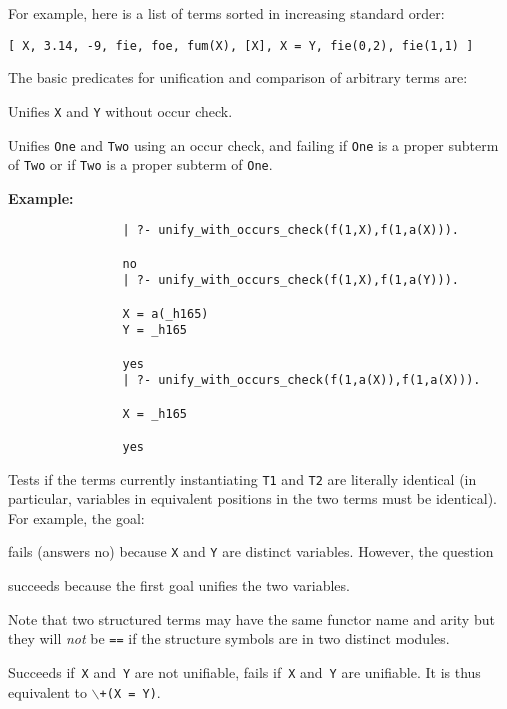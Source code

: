 For example, here is a list of terms sorted in increasing standard order:
\begin{center}
	{\tt [ X, 3.14, -9, fie, foe, fum(X), [X], X = Y, fie(0,2), fie(1,1) ]}
\end{center}
The basic predicates for unification and comparison of arbitrary terms are:
\begin{description}

    Unifies {\tt X} and {\tt Y} without occur check.

%
Unifies {\tt One} and {\tt Two} using an occur check, and failing if
{\tt One} is a proper subterm of {\tt Two} or if {\tt Two} is a proper
subterm of {\tt One}.  

{\bf Example:}
    {\footnotesize
     \begin{verbatim}
                | ?- unify_with_occurs_check(f(1,X),f(1,a(X))).

                no
                | ?- unify_with_occurs_check(f(1,X),f(1,a(Y))).

                X = a(_h165)
                Y = _h165

                yes
                | ?- unify_with_occurs_check(f(1,a(X)),f(1,a(X))).

                X = _h165

                yes
  \end{verbatim}}

%
    Tests if the terms currently instantiating {\tt T1} and {\tt T2}
    are literally identical (in particular, variables in equivalent positions
    in the two terms must be identical).
    For example, the goal:


    \noindent
    fails (answers no) because {\tt X} and {\tt Y} are distinct variables.
    However, the question


    \noindent
    succeeds because the first goal unifies the two variables.

    Note that two structured terms may have the same functor name and
    arity but they will {\em not} be {\tt ==} if the structure symbols
    are in two distinct modules.

    Succeeds if~{\tt X} and~{\tt Y} are not unifiable,
    fails if~{\tt X} and~{\tt Y} are unifiable.
    It is thus equivalent to {\tt $\backslash$+}\/{\tt (X = Y)}.


\end{description}
